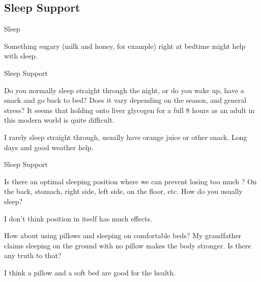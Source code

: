 \documentclass[11pt,oneside,openany,extrafontsizes]{memoir}
\begin{document}
\subsection{Sleep Support}

\begin{standalonequote}{Sleep}

    \begin{answer}
      Something sugary (milk and honey, for example) right at bedtime might help with sleep.
    \end{answer}
\end{standalonequote}

\begin{qaexchange}{Sleep Support}

    \begin{question}
        Do you normally sleep straight through the night, or do you wake up, have a snack and go back to bed? Does it vary depending on the season, and general stress? It seems that holding onto liver glycogen for a full 8 hours as an adult in this modern world is quite difficult. 
    \end{question}

    \begin{answer}
      I rarely sleep straight through, usually have orange juice or other snack. Long days and good weather help.
    \end{answer}
\end{qaexchange}

\begin{emailexchange}{Sleep Support}

    \begin{question}
        Is there an optimal sleeping position where we can prevent losing too much ? On the back, stomach, right side, left side, on the floor, etc. How do you usually sleep? 
    \end{question}

    \begin{answer}
      I don't think position in itself has much effects.
    \end{answer}

    \begin{question}
        How about using pillows and sleeping on comfortable beds? My grandfather claims sleeping on the ground with no pillow makes the body stronger. Is there any truth to that?
    \end{question}

    \begin{answer}
      I think a pillow and a soft bed are good for the health.
    \end{answer}
\end{emailexchange}
\end{document}
